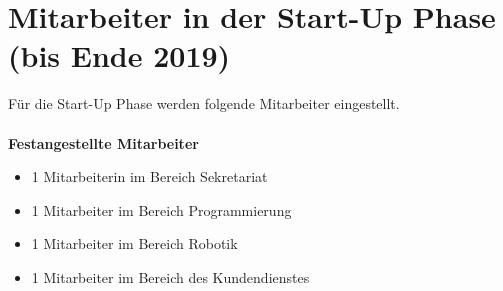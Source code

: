 \newpage
\section{Mitarbeiter in der Start-Up Phase (bis Ende 2019)}
Für die Start-Up Phase werden folgende Mitarbeiter eingestellt. \\\\
\textbf{Festangestellte Mitarbeiter}
\begin{itemize}
	\item 1 Mitarbeiterin im Bereich Sekretariat
	\item 1 Mitarbeiter im Bereich Programmierung
	\item 1 Mitarbeiter im Bereich Robotik
	\item 1 Mitarbeiter im Bereich des Kundendienstes 
\end{itemize}
